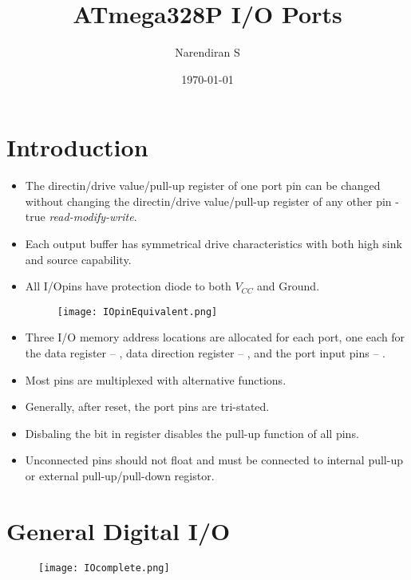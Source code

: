 \documentclass{article}
\title{ATmega328P I/O Ports}
\author{Narendiran S}
\date{\today}
\begin{document}
\maketitle

\section{Introduction}
\begin{itemize}
    \item The directin/drive value/pull-up register of one port pin can be changed without changing the directin/drive value/pull-up register  of any other pin - true \emph{read-modify-write}.
    \item Each output buffer has symmetrical drive characteristics with both high sink and source capability.
    \item All I/Opins have protection diode to both $V_{CC}$ and Ground.
    \begin{figure}[H]
        \begin{center}
            \texttt{[image: IOpinEquivalent.png]}
        \end{center}
    \end{figure}
    \item Three I/O memory address locations are allocated for each port, one each for the data register – , data direction register – , and the port input pins – .
    \item Most pins are multiplexed with alternative functions.
    \item Generally, after reset, the port pins are tri-stated.
    \item Disbaling the  bit in  register disables the pull-up function of all pins.
    \item Unconnected pins should not float and must be connected to internal pull-up or external pull-up/pull-down registor.
\end{itemize}


\section{General Digital I/O}
\begin{figure}[H]
    \begin{center}
        \texttt{[image: IOcomplete.png]}
    \end{center}
\end{figure}
\end{document}
